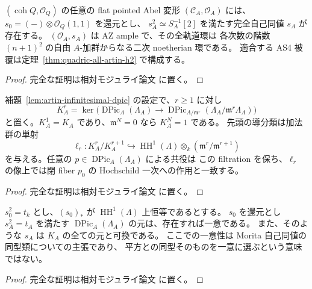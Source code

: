 \begin{corollary}
\label{cor:quadric-exact-root-all-artin}
$(\operatorname{coh}Q,\mathcal O_Q)$ の任意の flat pointed Abel 変形
$(\mathcal C_A,\mathcal O_A)$ には、$s_0=(-)\otimes\mathcal O_Q(1,1)$ を還元とし、
$s_A^2\simeq S_A^{-1}[2]$ を満たす完全自己同値 $s_A$ が存在する。
$(\mathcal O_A,s_A)$ は AZ ample で、その全軌道環は
各次数の階数 $(n+1)^2$ の自由 $A$-加群からなる二次 noetherian 環である。
適合する AS4 被覆は定理~\ref{thm:quadric-all-artin-h2} で構成する。
\end{corollary}
\begin{proof}
完全な証明は相対モジュライ論文 \cite[\texttt{artin_roots}]{QuadricModuli2026} に置く。
\end{proof}

\begin{lemma}
\label{lem:artin-dpic-associated-graded}
補題~\ref{lem:artin-infinitesimal-dpic} の設定で、$r\geq1$ に対し
\[
 K_A^r=\ker\bigl(\operatorname{DPic}_A(\Lambda_A)
       \longrightarrow
       \operatorname{DPic}_{A/\mathfrak m^r}
                    (\Lambda_A/\mathfrak m^r\Lambda_A)\bigr)
\]
と置く。$K_A^1=K_A$ であり、$\mathfrak m^N=0$ なら $K_A^N=1$ である。
先頭の導分類は加法群の単射
\[
 \ell_r:K_A^r/K_A^{r+1}\hookrightarrow
 \operatorname{HH}^1(\Lambda)\otimes_k
                  (\mathfrak m^r/\mathfrak m^{r+1})
\]
を与える。任意の $p\in\operatorname{DPic}_A(\Lambda_A)$ による共役は
この filtration を保ち、$\ell_r$ の像上では閉 fiber $p_0$ の
Hochschild 一次への作用と一致する。
\end{lemma}
\begin{proof}
完全な証明は相対モジュライ論文 \cite[\texttt{artin_roots}]{QuadricModuli2026} に置く。
\end{proof}

\begin{proposition}
\label{prop:artin-serre-root-uniqueness}
$s_0^2=t_k$ とし、$(s_0)_*$ が
$\operatorname{HH}^1(\Lambda)$ 上恒等であるとする。
$s_0$ を還元とし $s_A^2=t_A$ を満たす
$\operatorname{DPic}_A(\Lambda_A)$ の元は、存在すれば一意である。
また、そのような $s_A$ は $K_A$ の全ての元と可換である。
ここでの一意性は Morita 自己同値の同型類についての主張であり、
平方との同型そのものを一意に選ぶという意味ではない。
\end{proposition}
\begin{proof}
完全な証明は相対モジュライ論文 \cite[\texttt{artin_roots}]{QuadricModuli2026} に置く。
\end{proof}

